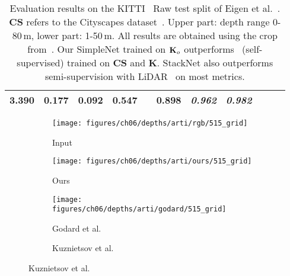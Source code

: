 \documentclass[runningheads]{llncs}
\begin{document}
\begin{table}[tb]
\begin{tabular}{lcccccccccc}
		\textbf{3.390} & \textbf{0.177} & 
		\textbf{0.092} & \textbf{0.547} && 
		\textbf{0.898} & \textit{0.962} & \textit{0.982} \\
		\hline      
	\end{tabular}
	\caption{
	Evaluation results on the KITTI~\cite{Geiger2012CVPR} Raw test split 
		of Eigen et 
		al.~\cite{eigen2014depth}. \textbf{CS} refers to the Cityscapes 
		dataset~\cite{Cordts2016Cityscapes}. Upper part: depth range 0-80\,m, 
		lower part: 1-50\,m.
All results are obtained using the crop 
		from~\cite{eigen2014depth}. Our SimpleNet trained on 
		$\text{\textbf{K}}_o$ outperforms~\cite{godard2016unsupervised} 
		(self-supervised) trained on 
		\textbf{CS} and 
		\textbf{K}. StackNet also outperforms 
		semi-supervision with LiDAR~\cite{kuznietsov2017semi} on most metrics.}
	\label{tab:6.1}
\end{table}\begin{figure}[tb]
	\centering
	\begin{subfigure}[t]{.24\textwidth}
		\centering
		\caption*{\tiny Input}
		\texttt{[image: figures/ch06/depths/arti/rgb/515\_grid]}
	\end{subfigure}
	\begin{subfigure}[t]{.24\textwidth}
		\centering
		\caption*{\tiny Ours}
		\texttt{[image: figures/ch06/depths/arti/ours/515\_grid]}
	\end{subfigure}
	\begin{subfigure}[t]{.24\textwidth}
		\centering
		\caption*{\tiny Godard et al.~\cite{godard2016unsupervised}}
		\texttt{[image: figures/ch06/depths/arti/godard/515\_grid]}
	\end{subfigure}
	\begin{subfigure}[t]{.24\textwidth}
		\centering
		\caption*{\tiny Kuznietsov et al.~\cite{kuznietsov2017semi}}

\end{subfigure}
\end{figure}
\end{document}
